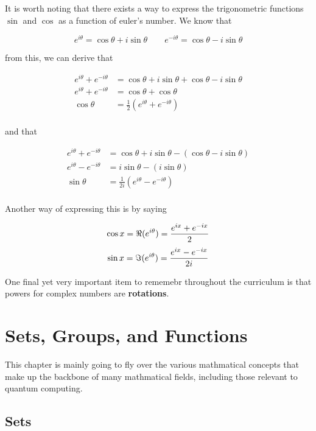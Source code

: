 \documentclass[12pt]{article}
\theoremstyle{definition}
\begin{document}
It is worth noting that there exists a way to express the trigonometric functions $\sin$ and $\cos$ as a function of euler's number. We know that 

$$
e^{i\theta} = \cos \theta + i \sin \theta \qquad e^{-i\theta} = \cos \theta - i \sin \theta
$$

from this, we can derive that 

\begin{align*}
    e^{i\theta} + e^{-i\theta} &= \cos \theta + i \sin \theta + \cos \theta - i \sin \theta \\
    e^{i\theta} + e^{-i\theta} &= \cos \theta + \cos \theta\\
    \cos \theta &= \frac{1}{2}\left(e^{i\theta} + e^{-i\theta}\right)\\
\end{align*}

and that 

\begin{align*}
    e^{i\theta} + e^{-i\theta} &= \cos \theta + i \sin \theta - (\cos \theta - i \sin \theta) \\
    e^{i\theta} - e^{-i\theta} &= i \sin \theta - \left(i \sin \theta\right)\\
    \sin \theta &= \frac{1}{2i}\left(e^{i\theta} - e^{-i\theta}\right)\\
\end{align*}

Another way of expressing this is by saying

$$
\cos x = \real(e^{i\theta}) = \frac{e^{ix} + e^{-ix}}{2}
$$
$$
\sin x = \imaginary(e^{i\theta}) = \frac{e^{ix} - e^{-ix}}{2i}
$$


One final yet very important item to rememebr throughout the curriculum is that powers for complex numbers are \textbf{rotations}.

\break

\section{Sets, Groups, and Functions}

This chapter is mainly going to fly over the various mathmatical concepts that make up the backbone of many mathmatical fields, including those relevant to quantum computing. 

\subsection{Sets}
\end{document}
